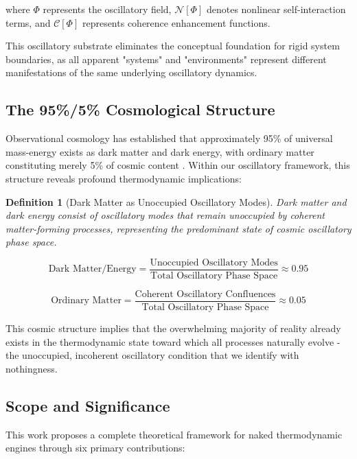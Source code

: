 \documentclass[11pt,a4paper]{article}
\newtheorem{definition}[theorem]{Definition}
\theoremstyle{remark}
\begin{document}
where $\Phi$ represents the oscillatory field, $\mathcal{N}[\Phi]$ denotes nonlinear self-interaction terms, and $\mathcal{C}[\Phi]$ represents coherence enhancement functions.

This oscillatory substrate eliminates the conceptual foundation for rigid system boundaries, as all apparent "systems" and "environments" represent different manifestations of the same underlying oscillatory dynamics.

\subsection{The 95\%/5\% Cosmological Structure}

Observational cosmology has established that approximately 95\% of universal mass-energy exists as dark matter and dark energy, with ordinary matter constituting merely 5\% of cosmic content \cite{planck2020results}. Within our oscillatory framework, this structure reveals profound thermodynamic implications:

\begin{definition}[Dark Matter as Unoccupied Oscillatory Modes]
Dark matter and dark energy consist of oscillatory modes that remain unoccupied by coherent matter-forming processes, representing the predominant state of cosmic oscillatory phase space.
\end{definition}

\begin{equation}
\text{Dark Matter/Energy} = \frac{\text{Unoccupied Oscillatory Modes}}{\text{Total Oscillatory Phase Space}} \approx 0.95
\label{eq:dark_fraction}
\end{equation}

\begin{equation}
\text{Ordinary Matter} = \frac{\text{Coherent Oscillatory Confluences}}{\text{Total Oscillatory Phase Space}} \approx 0.05
\label{eq:matter_fraction}
\end{equation}

This cosmic structure implies that the overwhelming majority of reality already exists in the thermodynamic state toward which all processes naturally evolve - the unoccupied, incoherent oscillatory condition that we identify with nothingness.

\subsection{Scope and Significance}

This work proposes a complete theoretical framework for naked thermodynamic engines through six primary contributions:
\end{document}
